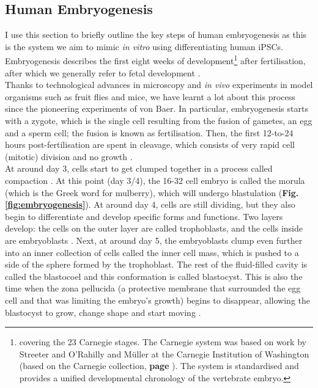 \newpage

\subsection{Human Embryogenesis}
\label{sec:human_embryogenesis}

I use this section to briefly outline the key steps of human embryogenesis as this is the system we aim to mimic \textit{in vitro} using differentiating human iPSCs.
Embryogenesis describes the first eight weeks of development\footnote{covering the 23 Carnegie stages.
The Carnegie system was based on work by Streeter \cite{streeter1942developmental} and O'Rahilly and Müller \cite{o1973developmental, o2010developmental} at the Carnegie Institution of Washington (based on the Carnegie collection, \textbf{page \pageref{sec:carnegie_collection}}).
The system is standardised and provides a unified developmental chronology of the vertebrate embryo.} after fertilisation, after which we generally refer to fetal development \cite{gilbert2008developmental}.\\

Thanks to technological advances in microscopy and \textit{in vivo} experiments in model organisms such as fruit flies and mice, we have learnt a lot about this process since the pioneering experiments of von Baer.
In particular, embryogenesis starts with a zygote, which is the single cell resulting from the fusion of gametes, an egg and a sperm cell; the fusion is known as fertilisation.
Then, the first 12-to-24 hours post-fertilisation are spent in cleavage, which consists of very rapid cell (mitotic) division and no growth \cite{khan2015human}.\\

At around day 3, cells start to get clumped together in a process called compaction \cite{iwata2014analysis}.
At this point (day 3/4), the 16-32 cell embryo is called the morula (which is the Greek word for mulberry), which will undergo blastulation \cite{wong2010non} (\textbf{Fig. \ref{fig:embryogenesis}}).
At around day 4, cells are still dividing, but they also begin to differentiate and develop specific forms and functions.
Two layers develop: the cells on the outer layer are called trophoblasts, and the cells inside are embryoblasts \cite{petropoulos2016single, niakan2013analysis}. 
Next, at around day 5, the embryoblasts clump even further into an inner collection of cells called the inner cell mass, which is pushed to a side of the sphere formed by the trophoblast.
The rest of the fluid-filled cavity is called the blastocoel and this conformation is called blastocyst.
This is also the time when the zona pellucida (a protective membrane that surrounded the egg cell and that was limiting the embryo's growth) begins to disappear, allowing the blastocyst to grow, change shape and start moving \cite{larsen2001human}.\\

